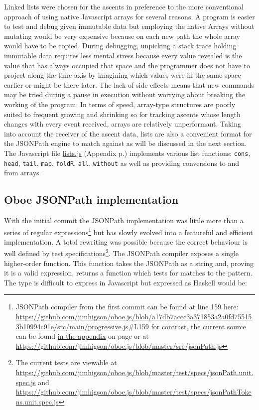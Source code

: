 \documentclass[12pt, ]{article}
\begin{document}
Linked lists were chosen for the ascents in preference to the more
conventional approach of using native Javascript arrays for several
reasons. A program is easier to test and debug given immutable data but
employing the native Arrays without mutating would be very expensive
because on each new path the whole array would have to be copied. During
debugging, unpicking a stack trace holding immutable data requires less
mental stress because every value revealed is the value that has always
occupied that space and the programmer does not have to project along
the time axis by imagining which values were in the same space earlier
or might be there later. The lack of side effects means that new
commands may be tried during a pause in execution without worrying about
breaking the working of the program. In terms of speed, array-type
structures are poorly suited to frequent growing and shrinking so for
tracking ascents whose length changes with every event received, arrays
are relatively unperformant. Taking into account the receiver of the
ascent data, lists are also a convenient format for the JSONPath engine
to match against as will be discussed in the next section. The
Javascript file \hyperref[headerux5flists]{lists.js} (Appendix
p.\pageref{src_lists}) implements various list functions: \texttt{cons},
\texttt{head}, \texttt{tail}, \texttt{map}, \texttt{foldR},
\texttt{all}, \texttt{without} as well as providing conversions to and
from arrays.

\subsection{Oboe JSONPath
implementation}\label{oboe-jsonpath-implementation}

With the initial commit the JSONPath implementation was little more than
a series of regular expressions\footnote{JSONPath compiler from the
  first commit can be found at line 159 here:
  \url{https://github.com/jimhigson/oboe.js/blob/a17db7accc3a371853a2a0fd755153b10994c91e/src/main/progressive.js}\#L159
  for contrast, the current source can be found
  \hyperref[jsonPath.js]{in the appendix} on page \pageref{src_jsonPath}
  or at
  \url{https://github.com/jimhigson/oboe.js/blob/master/src/jsonPath.js}}
but has slowly evolved into a featureful and efficient implementation. A
total rewriting was possible because the correct behaviour is well
defined by test specifications\footnote{The current tests are viewable
  at
  \url{https://github.com/jimhigson/oboe.js/blob/master/test/specs/jsonPath.unit.spec.js}
  and
  \url{https://github.com/jimhigson/oboe.js/blob/master/test/specs/jsonPathTokens.unit.spec.js}}.
The JSONPath compiler exposes a single higher-order function. This
function takes the JSONPath as a string and, proving it is a valid
expression, returns a function which tests for matches to the pattern.
The type is difficult to express in Javascript but expressed as Haskell
would be:
\end{document}
